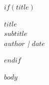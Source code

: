\documentclass[$if(fontsize)$$fontsize$,$endif$]{article}
\begin{document}
$if(title)$
\begin{center}
    {\Huge \textbf{\color{lynxblue}$title$}} \\
    \vspace{0.5em}
    {\Large $subtitle$} \\
    \vspace{1em}
    \textit{$author$ | $date$}
\end{center}
$endif$

$body$
\end{document}
